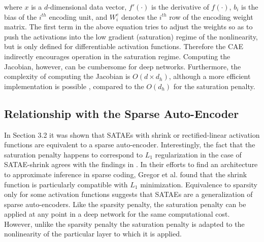 \noindent where $x$ is a $d$-dimensional data vector, $f'(\cdot)$ is the
derivative of $f(\cdot)$, $b_i$ is the bias of the $i^{th}$ encoding unit, and
$W^e_i$ denotes the $i^{th}$ row of the encoding weight matrix. The first term
in the above equation tries to adjust the weights so as to push the activations
into the low gradient (saturation) regime of the nonlinearity, but is only
defined for differentiable activation functions. Therefore the CAE indirectly
encourages operation in the saturation regime. Computing the Jacobian, however,
can be cumbersome for deep networks. Furthermore, the complexity of computing
the Jacobian is $O(d \times d_h)$, although a more efficient implementation is
possible \cite{CAE}, compared to the $O(d_h)$ for the saturation penalty.  

 
\subsection{Relationship with the Sparse Auto-Encoder} In Section 3.2 it was
shown that SATAEs with shrink or rectified-linear activation functions are
equivalent to a sparse auto-encoder. Interestingly, the fact that the
saturation penalty happens to correspond to $L_1$ regularization in the case of
SATAE-shrink agrees with the findings in \cite{LISTA}. In their efforts to find
an architecture to approximate inference in sparse coding, Gregor et al. found
that the shrink function is particularly compatible with $L_1$ minimization.
Equivalence to sparsity only for some activation functions suggests that SATAEs
are a generalization of sparse auto-encoders. Like the sparsity penalty, the
saturation penalty can be applied at any point in a deep network for the same
computational cost. However, unlike the sparsity penalty the saturation penalty
is adapted to the nonlinearity of the particular layer to which it is applied. 
